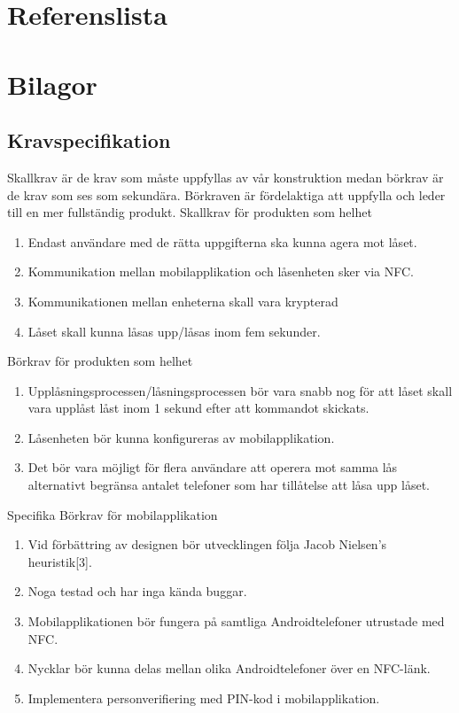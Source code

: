 \documentclass[11pt]{article}
\begin{document}
\textcite{article:Allah}
\textcite{online:Android_popular}

\newpage
\section*{Referenslista}

\printbibliography[]

\newpage
\section*{Bilagor}

\subsection*{Kravspecifikation}
Skallkrav är de krav som måste uppfyllas av vår konstruktion medan börkrav är de krav som ses som sekundära. Börkraven är fördelaktiga att uppfylla och leder till en mer fullständig produkt.
Skallkrav för produkten som helhet
\begin{enumerate}
\item Endast användare med de rätta uppgifterna ska kunna agera mot  låset.
\item Kommunikation mellan mobilapplikation och låsenheten sker via NFC.
\item Kommunikationen mellan enheterna skall vara krypterad
\item Låset skall kunna låsas upp/låsas inom fem sekunder.
\end{enumerate}
Börkrav för produkten som helhet
\begin{enumerate}
\item Upplåsningsprocessen/låsningsprocessen bör vara snabb nog för att låset skall vara upplåst låst inom 1 sekund efter att kommandot skickats.
\item Låsenheten bör kunna konfigureras av mobilapplikation.
\item Det bör vara möjligt för flera användare att operera mot samma lås alternativt begränsa antalet telefoner som har tillåtelse att låsa upp låset.
\end{enumerate}
Specifika Börkrav för mobilapplikation
\begin{enumerate}
\item Vid förbättring av designen bör utvecklingen följa Jacob Nielsen’s heuristik[3].
\item Noga testad och har inga kända buggar.
\item Mobilapplikationen bör fungera på samtliga Androidtelefoner utrustade med NFC.
\item Nycklar bör kunna delas mellan olika Androidtelefoner över en NFC-länk.
\item Implementera personverifiering med PIN-kod i mobilapplikation.
\end{enumerate}
\end{document}
